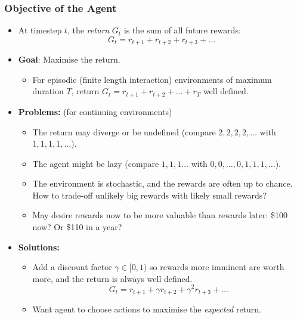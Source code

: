 \documentclass[10pt,a4paper]{beamer}
\begin{document}
\begin{frame}
	\frametitle{Objective of the Agent}
	
	\begin{itemize}
		\item At timestep $t$, the \textit{return} $G_t$ is the sum
		of all future rewards:
		$$
		G_t = r_{t+1} + r_{t+2} + r_{t+3} + \ldots 
		$$
		\pause
		\item \textbf{Goal}: Maximise the return.
		\pause
		\begin{itemize}
			\item For episodic  
			(finite length interaction) environments of maximum duration $T$,
			return $G_t = r_{t+1} + r_{t+2} + \ldots + r_T$ well defined.   
		\end{itemize}
		\pause
		\item \textbf{Problems:} (for continuing environments)
		\begin{itemize}
			\item The return may diverge or be undefined
			(compare $2,2,2,2,\ldots$ with $1,1,1,1,\ldots$).
			\item The agent might be lazy (compare $1,1,1\ldots$
			with $0,0,\ldots, 0, 1,1,1,\ldots$).
			\item The environment is stochastic, and the rewards are often
			up to chance. How to trade-off unlikely big rewards with
			likely small rewards?
			\item May desire rewards now to be more valuable than rewards later:
			\$100 now? Or \$110 in a year?
		\end{itemize}
		\pause
		\item \textbf{Solutions:} 
		\begin{itemize}
			\item Add a discount factor $\gamma \in [0, 1)$
			so rewards more imminent are worth more, and the
			return is always well defined.
			$$
			G_t = r_{t+1} + \gamma r_{t+2} + \gamma^2 r_{t+3} + \ldots 
			$$
			\item Want agent to choose actions to
			maximise the \textit{expected} return.
		\end{itemize}
		
	\end{itemize}
\end{frame}
\end{document}
